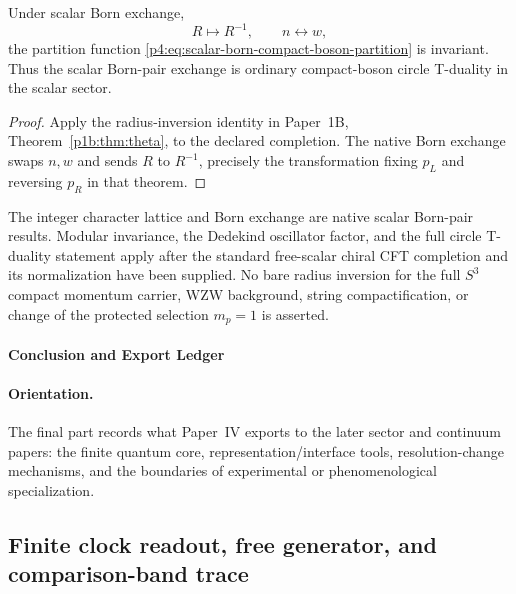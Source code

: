 \documentclass[12pt,a4paper]{article}
\begin{document}
\begin{corollary}
\label{p4:cor:scalar-born-t-duality}
Under scalar Born exchange,
\[
  R\mapsto R^{-1},
  \qquad
  n\leftrightarrow w,
\]
the partition function \eqref{p4:eq:scalar-born-compact-boson-partition} is invariant.  Thus the scalar Born-pair exchange is ordinary compact-boson circle T-duality in the scalar sector.
\end{corollary}

\begin{proof}
Apply the radius-inversion identity in Paper~1B,
Theorem~\ref{p1b:thm:theta}, to the declared completion. The native
Born exchange swaps $n,w$ and sends $R$ to $R^{-1}$, precisely the
transformation fixing $p_L$ and reversing $p_R$ in that theorem.
\end{proof}

\begin{remark}[Scope]
\label{p4:rem:scalar-born-duality-scope}
The integer character lattice and Born exchange are native scalar Born-pair results.  Modular invariance, the Dedekind oscillator factor, and the full circle T-duality statement apply after the standard free-scalar chiral CFT completion and its normalization have been supplied.  No bare radius inversion for the full \(S^3\) compact momentum carrier, WZW background, string compactification, or change of the protected selection \(m_p=1\) is asserted.
\end{remark}




\paragraph{Conclusion and Export Ledger}
\label{p4:part:conclusion-export-ledger}

\paragraph{Orientation.}
The final part records what Paper~IV exports to the later sector and continuum papers: the finite quantum core, representation/interface tools, resolution-change mechanisms, and the boundaries of experimental or phenomenological specialization.




\subsection{Finite clock readout, free generator, and comparison-band trace}
\label{p4:sec:v180-clock-free-readout}
\end{document}
